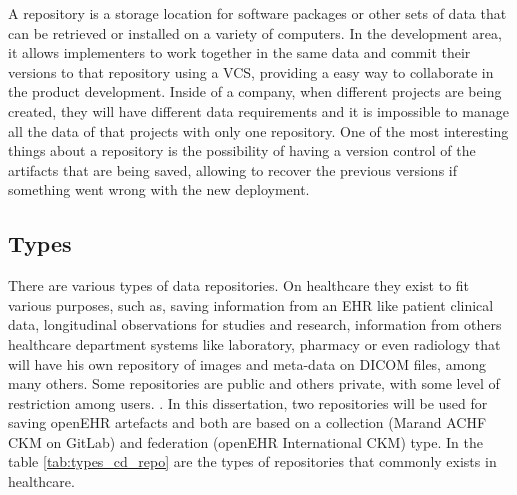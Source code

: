 \documentclass[mim_thesis.tex]{subfiles}
\begin{document}
A repository is a storage location for software packages or other sets of data that can be retrieved or installed on a variety of computers. In the development area, it allows implementers to work together in the same data and commit their versions to that repository using a \ac{VCS}, providing a easy way to collaborate in the product development. Inside of a company, when different projects are being created, they will have different data requirements and it is impossible to manage all the data of that projects with only one repository. One of the most interesting things about a repository is the possibility of having a version control of the artifacts that are being saved, allowing to recover the previous versions if something went wrong with the new deployment.

\subsection{Types}

There are various types of data repositories. On healthcare they exist to fit various purposes, such as, saving information from an EHR like patient clinical data, longitudinal observations for studies and research, information from others healthcare department systems like laboratory, pharmacy or even radiology that will have his own repository of images and meta-data on DICOM files, among many others. Some repositories are public and others private, with some level of restriction among users. \citep{wade2014traits}. In this dissertation, two repositories will be used for saving openEHR artefacts and both are based on a collection (Marand ACHF CKM on GitLab) and federation (openEHR International CKM) type. In the table \ref{tab:types_cd_repo} are the types of repositories that commonly exists in healthcare.
\end{document}
